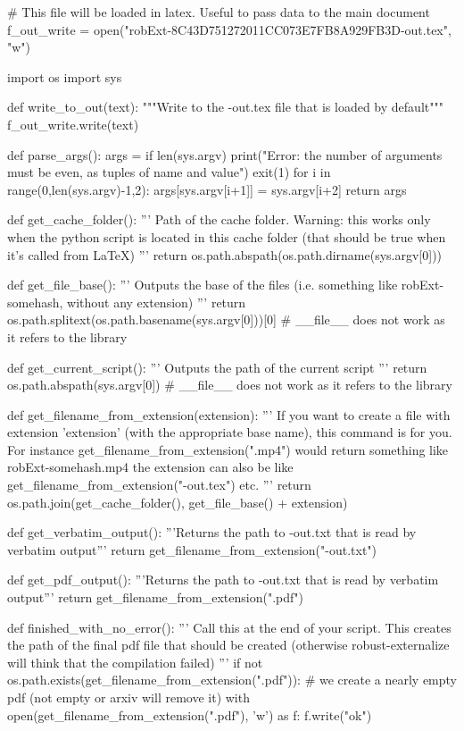 
# This file will be loaded in latex. Useful to pass data to the main document
f_out_write = open("robExt-8C43D751272011CC073E7FB8A929FB3D-out.tex", "w")

import os
import sys

def write_to_out(text):
    """Write to the -out.tex file that is loaded by default"""
    f_out_write.write(text)

def parse_args():
    args = {}
    if len(sys.argv) %
        print("Error: the number of arguments must be even, as tuples of name and value")
        exit(1)
    for i in range(0,len(sys.argv)-1,2):
        args[sys.argv[i+1]] = sys.argv[i+2]
    return args

def get_cache_folder():
    '''
    Path of the cache folder. Warning: this works only when the python script
    is located in this cache folder (that should be true when it's called from LaTeX)
    '''
    return os.path.abspath(os.path.dirname(sys.argv[0]))

def get_file_base():
    '''
    Outputs the base of the files (i.e. something like robExt-somehash, without any extension)
    '''
    return os.path.splitext(os.path.basename(sys.argv[0]))[0] # __file__ does not work as it refers to the library

def get_current_script():
    '''
    Outputs the path of the current script
    '''
    return os.path.abspath(sys.argv[0]) # __file__ does not work as it refers to the library


def get_filename_from_extension(extension):
    '''
    If you want to create a file with extension 'extension' (with the appropriate base name), this command
    is for you. For instance get_filename_from_extension(".mp4") would return something like
    robExt-somehash.mp4
    the extension can also be like get_filename_from_extension("-out.tex") etc.
    '''
    return os.path.join(get_cache_folder(), get_file_base() + extension)

def get_verbatim_output():
    '''Returns the path to -out.txt that is read by verbatim output'''
    return get_filename_from_extension("-out.txt")

def get_pdf_output():
    '''Returns the path to -out.txt that is read by verbatim output'''
    return get_filename_from_extension(".pdf")


def finished_with_no_error():
    '''
    Call this at the end of your script. This creates the path of the final pdf file that should be
    created (otherwise robust-externalize will think that the compilation failed)
    '''
    if not os.path.exists(get_filename_from_extension(".pdf")):
        # we create a nearly empty pdf (not empty or arxiv will remove it)
        with open(get_filename_from_extension(".pdf"), 'w') as f:
            f.write("ok")

